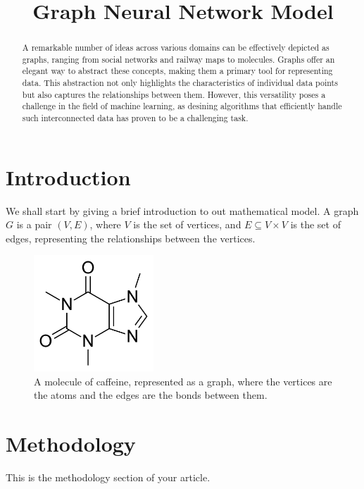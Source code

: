 \documentclass[12pt]{article}
\begin{document}
\title{Graph Neural Network Model}

\maketitle

\begin{abstract}
    A  remarkable  number  of  ideas  across  various  domains  can be effectively
    depicted   as   graphs,  ranging  from  social  networks  and  railway  maps  to
    molecules.  Graphs  offer  an  elegant  way  to  abstract these concepts, making
    them   a   primary  tool  for  representing  data.  This  abstraction  not  only
    highlights  the  characteristics  of  individual  data  points but also captures
    the  relationships  between  them.  However,  this versatility poses a challenge
    in  the  field  of  machine  learning,  as  desining algorithms that efficiently
    handle such interconnected data has proven to be a challenging task.
\end{abstract}

\section{Introduction}
    We shall start by giving a brief introduction to out mathematical model.
    A graph $G$ is a pair $(V, E)$, where $V$ is the set of vertices, and 
    $E \subseteq V \times V$ is the set of edges, representing the relationships
    between the vertices.

    \begin{figure}
        \centering
        \includegraphics[width=0.4\textwidth]{img/Caffeine_structure.png}
        \caption{A molecule of caffeine, represented as a graph, where the vertices are the atoms and the edges are the bonds between them.}
        \label{fig:graph}
    \end{figure}

\section{Methodology}
This is the methodology section of your article.
\end{document}
